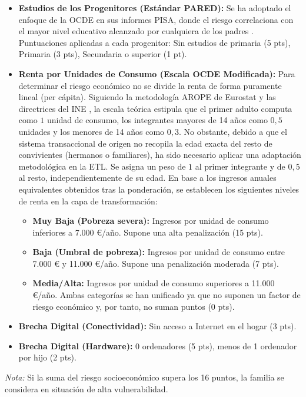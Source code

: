 \begin{itemize}
    \item \textbf{Estudios de los Progenitores (Estándar PARED):} Se ha adoptado el enfoque de la OCDE en sus informes PISA, donde el riesgo correlaciona con el mayor nivel educativo alcanzado por cualquiera de los padres \cite{OECD_PISA}. Puntuaciones aplicadas a cada progenitor: Sin estudios de primaria (5 pts), Primaria (3 pts), Secundaria o superior (1 pt).
    \item \textbf{Renta por Unidades de Consumo (Escala OCDE Modificada):} Para determinar el riesgo económico no se divide la renta de forma puramente lineal (per cápita). Siguiendo la metodología AROPE de Eurostat y las directrices del INE \cite{INE_ECV, EAPN_Pobreza}, la escala teórica estipula que el primer adulto computa como $1$ unidad de consumo, los integrantes mayores de 14 años como $0,5$ unidades y los menores de 14 años como $0,3$. No obstante, debido a que el sistema transaccional de origen no recopila la edad exacta del resto de convivientes (hermanos o familiares), ha sido necesario aplicar una adaptación metodológica en la ETL. Se asigna un peso de $1$ al primer integrante y de $0,5$ al resto, independientemente de su edad. En base a los ingresos anuales equivalentes obtenidos tras la ponderación, se establecen los siguientes niveles de renta en la capa de transformación:
    \begin{itemize}
        \item \textbf{Muy Baja (Pobreza severa):} Ingresos por unidad de consumo inferiores a 7.000 €/año. Supone una alta penalización (15 pts).
        \item \textbf{Baja (Umbral de pobreza):} Ingresos por unidad de consumo entre 7.000 € y 11.000 €/año. Supone una penalización moderada (7 pts).
        \item \textbf{Media/Alta:} Ingresos por unidad de consumo superiores a 11.000 €/año. Ambas categorías se han unificado ya que no suponen un factor de riesgo económico y, por tanto, no suman puntos (0 pts).
    \end{itemize}
    \item \textbf{Brecha Digital (Conectividad):} Sin acceso a Internet en el hogar (3 pts).
    \item \textbf{Brecha Digital (Hardware):} 0 ordenadores (5 pts), menos de 1 ordenador por hijo (2 pts).
\end{itemize}
\textit{Nota:} Si la suma del riesgo socioeconómico supera los 16 puntos, la familia se considera en situación de alta vulnerabilidad.

